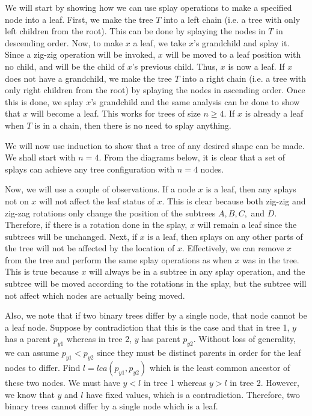 \documentclass[psamsfonts]{amsart}
\newenvironment{sol}{\vspace{0.25cm}{\large \bfseries Solution:}}{\qedsymbol}
\begin{document}
\begin{sol}
We will start by showing how we can use splay operations to make a specified node into a leaf. First, we make the tree $T$ into a left chain (i.e. a tree with only left children from the root). This can be done by splaying the nodes in $T$ in descending order. Now, to make $x$ a leaf, we take $x$'s grandchild and splay it. Since a zig-zig operation will be invoked, $x$ will be moved to a leaf position with no child, and will be the child of $x$'s previous child. Thus, $x$ is now a leaf. If $x$ does not have a grandchild, we make the tree $T$ into a right chain (i.e. a tree with only right children from the root) by splaying the nodes in ascending order. Once this is done, we splay $x$'s grandchild and the same analysis can be done to show that $x$ will become a leaf. This works for trees of size $n \geq 4$. If $x$ is already a leaf when $T$ is in a chain, then there is no need to splay anything.

We will now use induction to show that a tree of any desired shape can be made. We shall start with $n=4$. From the diagrams below, it is clear that a set of splays can achieve any tree configuration with $n=4$ nodes.

Now, we will use a couple of observations. If a node $x$ is a leaf, then any splays not on $x$ will not affect the leaf status of $x$. This is clear because both zig-zig and zig-zag rotations only change the position of the subtrees $A, B, C,$ and $D$. Therefore, if there is a rotation done in the splay, $x$ will remain a leaf since the subtrees will be unchanged. Next, if $x$ is a leaf, then splays on any other parts of the tree will not be affected by the location of $x$. Effectively, we can remove $x$ from the tree and perform the same splay operations as when $x$ was in the tree. This is true because $x$ will always be in a subtree in any splay operation, and the subtree will be moved according to the rotations in the splay, but the subtree will not affect which nodes are actually being moved. 

Also, we note that if two binary trees differ by a single node, that node cannot be a leaf node. Suppose by contradiction that this is the case and that in tree 1, $y$ has a parent $p_{y1}$ whereas in tree 2, $y$ has parent $p_{y2}$. Without loss of generality, we can assume $p_{y1} < p_{y2}$ since they must be distinct parents in order for the leaf nodes to differ. Find $l = lca(p_{y1}, p_{y2})$ which is the least common ancestor of these two nodes. We must have $y < l$ in tree 1 whereas $y > l$ in tree 2. However, we know that $y$ and $l$ have fixed values, which is a contradiction. Therefore, two binary trees cannot differ by a single node which is a leaf.


\end{sol}
\end{document}
